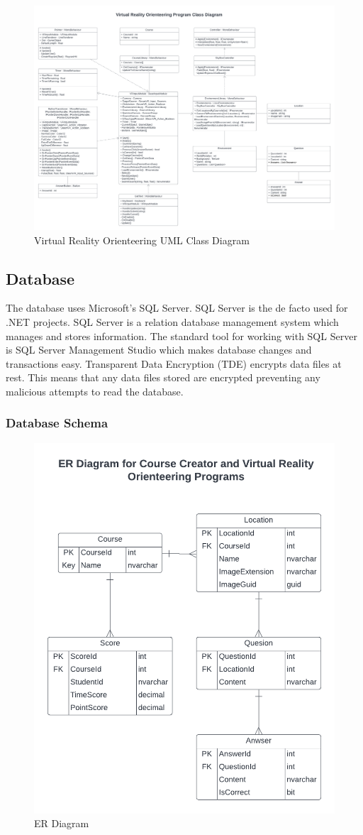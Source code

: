 \begin{figure}[htb]
	\centering
	\includegraphics[width=.9\textwidth]{Design/assets/vr-class-diagram.png}
	\caption[Virutal Reality Orienteering UML Class Diagram]{\label{Virtual Reality Orienteering UML Class Diagram}Virtual Reality Orienteering UML Class Diagram}
\end{figure}

\subsection{Database}
The database uses Microsoft's SQL Server. SQL Server is the de facto used for .NET projects.  SQL Server is a relation database management system which manages and stores information. The standard tool for working with SQL Server is SQL Server Management Studio which makes database changes and transactions easy. Transparent Data Encryption (TDE) encrypts data files at rest. This means that any data files stored are encrypted preventing any malicious attempts to read the database.

\subsubsection{Database Schema}
\begin{figure}[htb]
	\centering
	\includegraphics[width=.6\textwidth]{Design/assets/capstone-er-diagram.png}
	\caption[ER Diagram]{\label{ER Diagram}ER Diagram}
\end{figure}
